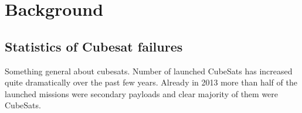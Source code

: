 \documentclass[english,12pt,a4paper,pdftex,elec,utf8]{aaltothesis}
\begin{document}
\clearpage

\section{Background}
\subsection{Statistics of Cubesat failures}
Something general about cubesats. Number of launched CubeSats has increased quite dramatically over the past few years. Already in 2013 more than half of the launched missions were secondary payloads and clear majority of them were CubeSats. 
\end{document}
